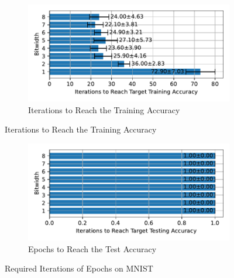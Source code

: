     \label{appendix:iterations_mnist}
        \begin{figure}[H]
            \centering
            \begin{subfigure}[H]{0.6\textwidth}
                \centering
                \includegraphics[width=\textwidth]{../standard/MNIST/plots/mnist_train_iters_horizontal.pdf}
                \caption{Iterations to Reach the Training Accuracy}
            \end{subfigure}
        \end{figure}
        \begin{figure}[H]
            \centering
            \ContinuedFloat
            \begin{subfigure}[H]{0.6\textwidth}
                \centering
                \includegraphics[width=\textwidth]{../standard/MNIST/plots/mnist_test_iters_horizontal.pdf}
                \caption{Epochs to Reach the Test Accuracy}
            \end{subfigure}
            \caption{Required Iterations of Epochs on MNIST}
        \end{figure}

